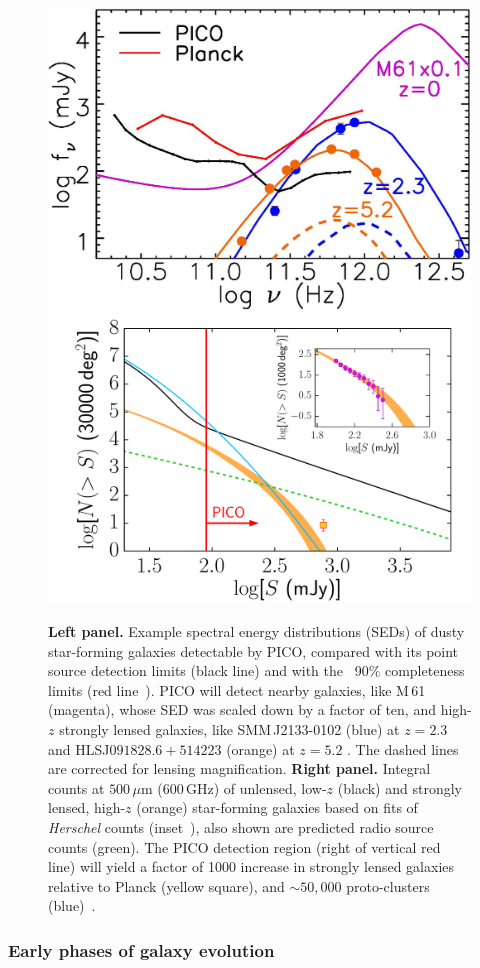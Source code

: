 \documentclass[PICOReport.tex]{subfiles}
\begin{document}
\begin{figure}
\begin{center}
\includegraphics[width=0.41\columnwidth, trim={0 0 0 0cm}, clip]{images/fig_SED_PICO.jpg}
\hspace{0.75cm}
\includegraphics[width=0.4\columnwidth, trim={0 0 0 0cm}, clip]{images/NgtF_pico_NEW.pdf}
\vskip-0.3cm
\caption{\textbf{Left panel.} Example spectral energy distributions (SEDs) of dusty star-forming galaxies detectable by PICO, compared with its point source detection limits (black line) and with the \planck\ 90\% completeness limits (red line~\cite{PCCS2}). PICO will detect nearby galaxies, like M\,61 (magenta), whose SED was scaled down by a factor of ten, and high-$z$ strongly lensed galaxies, like SMM\,J2133-0102 (blue)  at $z=2.3$ \cite{Swinbank2010} and HLSJ$091828.6{+}514223$ (orange) at $z=5.2$ \cite{Combes2012}. The dashed lines are corrected for lensing magnification.  \textbf{Right panel.} Integral counts at $500\,\mu$m (600\,GHz) of unlensed, low-$z$ (black) and strongly lensed, high-$z$ (orange) star-forming galaxies based on fits of \textit{Herschel} counts (inset~\citep{Negrello2017lensed}), also shown are predicted radio source counts (green). The PICO detection region (right of vertical red line) will yield a factor of 1000 increase in strongly lensed galaxies relative to Planck (yellow square),
and $\sim50,000$ proto-clusters (blue)~\citep{Negrello2017protocl}.}
\label{fig:SED3}
\end{center}
\vspace{-0.15in}
\end{figure}

\subsubsection{Early phases of galaxy evolution}
\end{document}
